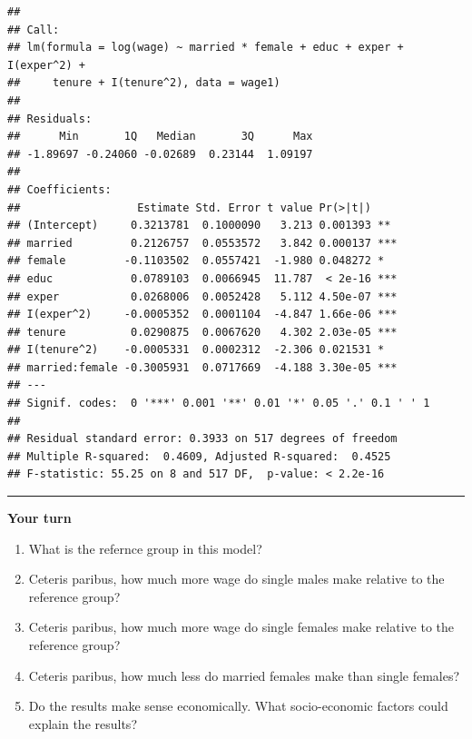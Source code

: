 \documentclass[]{book}
\providecommand{\tightlist}{%
  \setlength{\itemsep}{0pt}\setlength{\parskip}{0pt}}
\begin{document}
\begin{verbatim}
## 
## Call:
## lm(formula = log(wage) ~ married * female + educ + exper + I(exper^2) + 
##     tenure + I(tenure^2), data = wage1)
## 
## Residuals:
##      Min       1Q   Median       3Q      Max 
## -1.89697 -0.24060 -0.02689  0.23144  1.09197 
## 
## Coefficients:
##                  Estimate Std. Error t value Pr(>|t|)    
## (Intercept)     0.3213781  0.1000090   3.213 0.001393 ** 
## married         0.2126757  0.0553572   3.842 0.000137 ***
## female         -0.1103502  0.0557421  -1.980 0.048272 *  
## educ            0.0789103  0.0066945  11.787  < 2e-16 ***
## exper           0.0268006  0.0052428   5.112 4.50e-07 ***
## I(exper^2)     -0.0005352  0.0001104  -4.847 1.66e-06 ***
## tenure          0.0290875  0.0067620   4.302 2.03e-05 ***
## I(tenure^2)    -0.0005331  0.0002312  -2.306 0.021531 *  
## married:female -0.3005931  0.0717669  -4.188 3.30e-05 ***
## ---
## Signif. codes:  0 '***' 0.001 '**' 0.01 '*' 0.05 '.' 0.1 ' ' 1
## 
## Residual standard error: 0.3933 on 517 degrees of freedom
## Multiple R-squared:  0.4609, Adjusted R-squared:  0.4525 
## F-statistic: 55.25 on 8 and 517 DF,  p-value: < 2.2e-16
\end{verbatim}

\begin{center}\rule{0.5\linewidth}{\linethickness}\end{center}

\textbf{Your turn}

\begin{enumerate}
\def\labelenumi{\arabic{enumi}.}
\tightlist
\item
  What is the refernce group in this model?
\item
  Ceteris paribus, how much more wage do single males make relative to
  the reference group?
\item
  Ceteris paribus, how much more wage do single females make relative to
  the reference group?
\item
  Ceteris paribus, how much less do married females make than single
  females?
\item
  Do the results make sense economically. What socio-economic factors
  could explain the results?
\end{enumerate}
\end{document}
